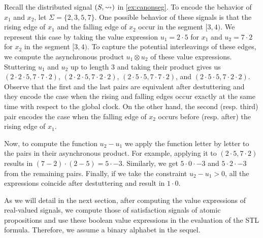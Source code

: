 \begin{example} \label{ex:valexpr}
	Recall the distributed signal $(S, {\rightsquigarrow})$ in \cref{ex:canonseg}.
	To encode the behavior of $x_1$ and $x_2$, let $\Sigma = \{2, 3, 5, 7\}$.
	One possible behavior of these signals is that the rising edge of $x_1$ and the falling edge of $x_2$ occur in the segment $[3,4)$.
	We represent this case by taking the value expression $u_1 = 2 \cdot 5$ for $x_1$ and $u_2 = 7 \cdot 2$ for $x_2$ in the segment $[3,4)$.
	To capture the potential interleavings of these edges, we compute the asynchronous product $u_1 \otimes u_2$ of these value expressions.
	Stuttering $u_1$ and $u_2$ up to length 3 and taking their product gives us
	$(2 \cdot 2 \cdot 5, 7 \cdot 7 \cdot 2)$,
	$(2 \cdot 2 \cdot 5, 7 \cdot 2 \cdot 2)$,
	$(2 \cdot 5 \cdot 5, 7 \cdot 7 \cdot 2)$, and
	$(2 \cdot 5 \cdot 5, 7 \cdot 2 \cdot 2)$.
	Observe that the first and the last pairs are equivalent after destuttering and they encode the case when the rising and falling edges occur exactly at the same time with respect to the global clock.
	On the other hand, the second (resp. third) pair encodes the case when the falling edge of $x_2$ occurs before (resp. after) the rising edge of $x_1$.
	
	Now, to compute the function $u_2 - u_1$ we apply the function letter by letter to the pairs in their asynchronous product.
	For example, applying it to $(2 \cdot 5, 7 \cdot 2)$ results in $(7 - 2) \cdot (2 - 5) = 5 \cdot -3$.
	Similarly, we get $5 \cdot 0 \cdot -3$ and $5 \cdot 2 \cdot -3$ from the remaining pairs.
	Finally, if we take the constraint $u_2 - u_1  > 0$, all the expressions coincide after destuttering and result in $1 \cdot 0$.
\end{example}

As we will detail in the next section, after computing the value expressions of real-valued signals, we compute those of satisfaction signals of atomic propositions and use these boolean value expressions in the evaluation of the STL formula.
Therefore, we assume a binary alphabet in the sequel.

